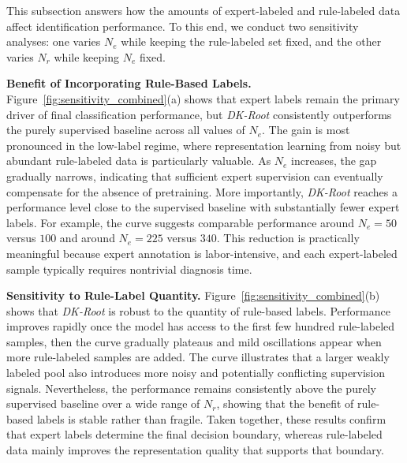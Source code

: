 \documentclass[lettersize,journal]{IEEEtran}
\begin{document}
{\color{R3color}
This subsection answers how the amounts of expert-labeled and rule-labeled data affect identification performance. To this end, we conduct two sensitivity analyses: one varies $N_e$ while keeping the rule-labeled set fixed, and the other varies $N_r$ while keeping $N_e$ fixed.


\noindent\textbf{Benefit of Incorporating Rule-Based Labels.}
Figure~\ref{fig:sensitivity_combined}(a) shows that expert labels remain the primary driver of final classification performance, but \textit{DK-Root} consistently outperforms the purely supervised baseline across all values of $N_e$. The gain is most pronounced in the low-label regime, where representation learning from noisy but abundant rule-labeled data is particularly valuable. As $N_e$ increases, the gap gradually narrows, indicating that sufficient expert supervision can eventually compensate for the absence of pretraining. More importantly, \textit{DK-Root} reaches a performance level close to the supervised baseline with substantially fewer expert labels. For example, the curve suggests comparable performance around $N_e=50$ versus $100$ and around $N_e=225$ versus $340$. This reduction is practically meaningful because expert annotation is labor-intensive, and each expert-labeled sample typically requires nontrivial diagnosis time.

\noindent\textbf{Sensitivity to Rule-Label Quantity.}
Figure~\ref{fig:sensitivity_combined}(b) shows that \textit{DK-Root} is robust to the quantity of rule-based labels. Performance improves rapidly once the model has access to the first few hundred rule-labeled samples, then the curve gradually plateaus and mild oscillations appear when more rule-labeled samples are added. The curve illustrates that a larger weakly labeled pool also introduces more noisy and potentially conflicting supervision signals. Nevertheless, the performance remains consistently above the purely supervised baseline over a wide range of $N_r$, showing that the benefit of rule-based labels is stable rather than fragile. Taken together, these results confirm that expert labels determine the final decision boundary, whereas rule-labeled data mainly improves the representation quality that supports that boundary.


}
\end{document}
